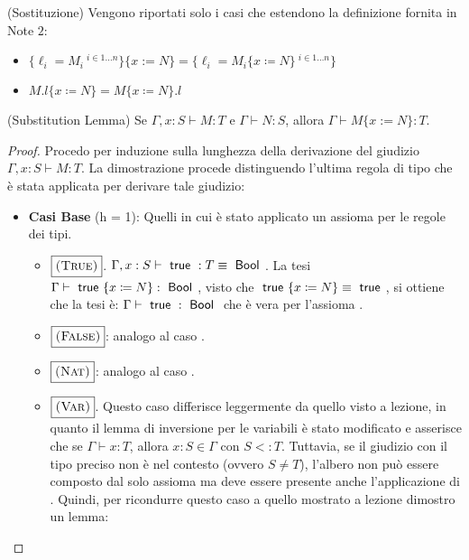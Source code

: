 (Sostituzione)
	Vengono riportati solo i casi che estendono la definizione fornita in Note $2$:
	\begin{itemize}
		\item $\{\ell_i = M_i\ ^{i \in 1 \dots n} \} \{x := N\} = \{\ell_i = M_i \{x \coloneqq N\}\ ^{i \in 1 \dots n} \}$
		\item $M.l\{x \coloneqq N \} = M\{x \coloneqq N \}.l$
	\end{itemize}



(Substitution Lemma)
Se $\Gamma, x : S \vdash M : T$ e $\Gamma \vdash N : S$, allora $\Gamma \vdash M\{x := N\}:T.$	

\begin{proof}
Procedo per induzione sulla lunghezza della derivazione del giudizio
$\Gamma, x : S \vdash M : T$. La dimostrazione procede distinguendo l'ultima
regola di tipo che \`e stata applicata per derivare tale giudizio:
\begin{itemize}
	\item \textbf{Casi Base} (h = 1): Quelli in cui \`e stato applicato un assioma per le regole dei tipi.
	\begin{itemize}
		\item $\boxed{\textsc{(True)}}$. 
		$\Gamma, x : S \vdash \true : T \equiv \Bool$. La tesi $\Gamma \vdash \true\{x \coloneqq N\} : \Bool$, visto
		che $\true \{x \coloneqq N \} \equiv \true$, si ottiene che la tesi \`e:
		$\Gamma \vdash \true: \Bool$ che \`e vera per l'assioma .
		\item $\boxed{\textsc{(False)}}$: analogo al caso .
		\item $\boxed{\textsc{(Nat)}}$: analogo al caso .
		\item $\boxed{\textsc{(Var)}}$. Questo caso differisce leggermente da quello visto a lezione, in quanto il lemma di inversione
		per le variabili \`e stato modificato e asserisce che se $\Gamma \vdash x : T$, allora $x: S \in \Gamma$ con $S <: T$. 
		Tuttavia, se il giudizio con il tipo preciso non \`e nel contesto (ovvero $S \neq T$), l'albero non pu\`o essere composto dal solo assioma  ma
		deve essere presente anche l'applicazione di .
		Quindi, per ricondurre questo caso a quello mostrato a lezione dimostro un lemma:
		\vspace{10pt}
		

\end{itemize}
\end{itemize}
\end{proof}
